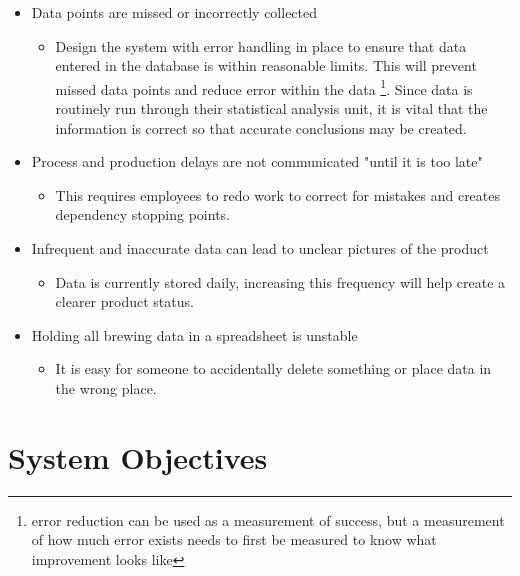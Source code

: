 \documentclass[draftclsnofoot,onecolumn,letterpaper,10pt]{IEEEtran}
\begin{document}
\begin{itemize}
	\item {Data points are missed or incorrectly collected}
	\begin{itemize}
		\item {
			Design the system with error handling in place to ensure that data entered in the database is within reasonable limits.
			This will prevent missed data points and reduce error within the data \footnote{error reduction can be used as a measurement of success, but a measurement of how much error exists needs to first be measured to know what improvement looks like}.
			Since data is routinely run through their statistical analysis unit, it is vital that the information is correct so that accurate conclusions may be created.
		}
	\end{itemize}

	\item {Process and production delays are not communicated "until it is too late"}
	\begin{itemize}
		\item {This requires employees to redo work to correct for mistakes and creates dependency stopping points.}
	\end{itemize}

	\item {Infrequent and inaccurate data can lead to unclear pictures of the product}
	\begin{itemize}
		\item {Data is currently stored daily, increasing this frequency will help create a clearer product status.}
	\end{itemize}

	\item {Holding all brewing data in a spreadsheet is unstable}
	\begin{itemize}
		\item {It is easy for someone to accidentally delete something or place data in the wrong place.}
	\end{itemize}

\end{itemize}

\section{System Objectives}
\end{document}
